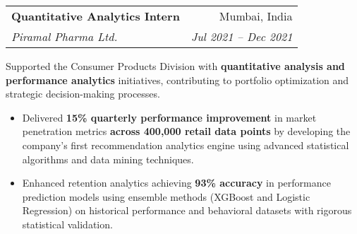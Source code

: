 \documentclass[letterpaper,11pt]{article}
\makeatletter
\newcommand{\resumeItem}[1]{
\justifying
  \item{\small{#1}}
  \vspace{-2px}
}
\newcommand{\resumeSubheading}[4]{
  \item
    \begin{tabular*}{1\textwidth}{l@{\extracolsep{\fill}}r}
      \textbf{\large{#1}} & {\small{#2}} \\
      {\textsl{{#3}}} & {\textsl{\small{#4}}}
    \end{tabular*}
  \vspace{-0.5cm}
}
\newcommand{\resumeItemListStart}{
  \vspace{-5pt}
  \begin{itemize}[leftmargin=0.21in, label=\textbullet]
}
\newcommand{\resumeItemListEnd}{\end{itemize}}
\makeatother
\begin{document}



\vspace{-1pt}
\resumeSubheading
    {Quantitative Analytics Intern}
    {Mumbai, India}
    {Piramal Pharma Ltd.}
    {Jul 2021 -- Dec 2021}
\vspace{1pt}
\resumeItem{Supported the Consumer Products Division with \textbf{quantitative analysis and performance analytics} initiatives, contributing to portfolio optimization and strategic decision-making processes.}
\resumeItemListStart
\resumeItem{Delivered \textbf{15\% quarterly performance improvement} in market penetration metrics \textbf{across 400,000 retail data points} by developing the company's first recommendation analytics engine using advanced statistical algorithms and data mining techniques.}
\resumeItem{Enhanced retention analytics achieving \textbf{93\% accuracy} in performance prediction models using ensemble methods (XGBoost and Logistic Regression) on historical performance and behavioral datasets with rigorous statistical validation.}
\resumeItemListEnd
\end{document}
